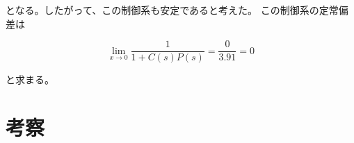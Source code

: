 \documentclass[uplatex, 11pt,a4j, titlepage]{jsarticle}
\begin{document}
となる。したがって、この制御系も安定であると考えた。
この制御系の定常偏差は

\begin{equation}
    \lim_{x \to 0} \frac{1}{1 + C(s)P(s)} 
        = \frac{0}{3.91} = 0
\end{equation}

と求まる。

\section{考察}


\newpage
\thispagestyle{empty}
\nocite{Material}


\end{document}
